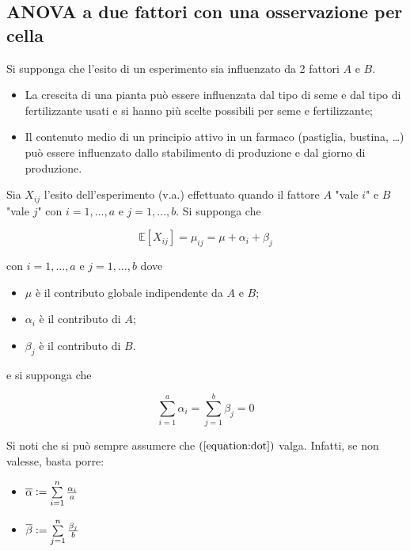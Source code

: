 \documentclass[hidelinks, 10pt]{report}
\begin{document}
\subsection{ANOVA a due fattori con una osservazione per cella}
Si supponga che l'esito di un esperimento sia influenzato da 2 fattori $ A $ e $ B $.

\begin{es}
\noindent
\begin{itemize}
\item La crescita di una pianta pu\`o essere influenzata dal tipo di seme e dal tipo di fertilizzante usati e si hanno pi\`u scelte possibili per seme e fertilizzante;
\item Il contenuto medio di un principio attivo in un farmaco (pastiglia, bustina, \ldots) pu\`o essere influenzato dallo stabilimento di produzione e dal giorno di produzione.
\end{itemize}
\end{es}

Sia $ X_{ij} $ l'esito dell'esperimento (v.a.) effettuato quando il fattore $ A $ "vale $ i $" e $ B $ "vale $ j $" con $ i = 1, \dotsc, a $ e $ j = 1, \dotsc, b $. Si supponga che

\[ \mathbb{E}[X_{ij}] = \mu_{ij} = \mu + \alpha_{i} + \beta_{j} \]

con $ i = 1, \dotsc, a $ e $ j = 1, \dotsc, b $ dove

\begin{itemize}
\item $ \mu $ \`e il contributo globale indipendente da $ A $ e $ B $;
\item $ \alpha_{i} $ \`e il contributo di $ A $;
\item $ \beta_{j} $ \`e il contributo di $ B $.
\end{itemize}

e si supponga che

\begin{equation} \label{equation:dot}
\sum\limits_{i = 1}^{a} \alpha_{i} = \sum\limits_{j = 1}^{b} \beta_{j} = 0
\end{equation}

Si noti che si pu\`o sempre assumere che $ (\ref{equation:dot}) $ valga. Infatti, se non valesse, basta porre:

\begin{itemize}
\item $ \overline{\alpha} \vcentcolon= \sum\limits_{i = 1}^{n} \frac{\alpha_{i}}{a} $
\item $ \overline{\beta} \vcentcolon= \sum\limits_{j = 1}^{n} \frac{\beta_{j}}{b} $
\end{itemize}
\end{document}
